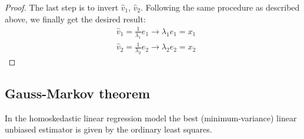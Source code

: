 \begin{proof}
The last step is to invert $\hat{v}_1$, $\hat{v}_2$.
Following the same procedure as described above, we finally get the desired result:
\begin{align*}
& \hat{v}_1 = \frac{1}{\lambda_1} e_1 \to \lambda_1 e_1 = x_1 \\
& \hat{v}_2 = \frac{1}{\lambda_2} e_2 \to \lambda_2 e_2 = x_2
\end{align*}
\end{proof}

\vspace{3.5cm}
\subsection{Gauss-Markov theorem}

\begin{theorem}
In the homoskedastic linear regression model the best (minimum-variance) linear
unbiased estimator is given by the ordinary least squares.
\end{theorem}


